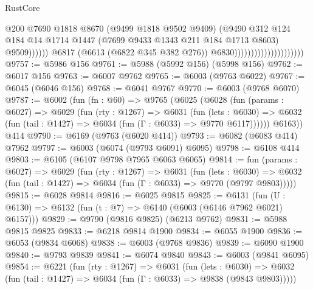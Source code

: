 \begin{lexlean}{RustCore}
\begin{coremodule}
{\begin{coremodule}
{{{{{{{{{{{{{{{{{{{{{{{{{{{{{{{{{{{{{{{{{{{{{{{                                                        @200
                                                        @7690
                                                        @1818
                                                        @8670
                                                        (@9499 @1818 @9502 @9409)
                                                        (@9490
                                                          @312
                                                          @124
                                                          @184
                                                          @14
                                                          @1714
                                                          @1447
                                                          (@7699 @9433 @1343 @211 @184 @1713 @8603)
                                                          @9509))))))
                                              @6817
                                              (@6613 (@6822 @345 @382 @276))
                                              @6830)))))))))))))))))))))
@9757 := @5986 @156
@9761 := @5988 (@5992 @156) (@5998 @156)
@9762 := @6017 @156
@9763 := @6007 @9762
@9765 := @6003 (@9763 @6022)
@9767 := @6045 (@6046 @156)
@9768 := @6041 @9767
@9770 := @6003 (@9768 @6070)
@9787 := @6002
    (fun (fn : @60) =>
    @9765
      (@6025
        (@6028
          (fun (params : @6027) =>
          @6029
            (fun (rty : @1267) =>
            @6031
              (fun (lets : @6030) =>
              @6032 (fun (tail : @1427) => @6034 (fun (Γ : @6033) => @9770 @6117))))))
        @6163))
    @414
@9790 := @6169 (@9763 (@6020 @414))
@9793 := @6082 (@6083 @414) @7962
@9797 := @6003 (@6074 (@9793 @6091) @6095)
@9798 := @6108 @414
@9803 := @6105 (@6107 @9798 @7965 @6063 @6065)
@9814 := fun (params : @6027) =>
  @6029
    (fun (rty : @1267) =>
    @6031
      (fun (lets : @6030) =>
      @6032 (fun (tail : @1427) => @6034 (fun (Γ : @6033) => @9770 (@9797 @9803)))))
@9815 := @6028 @9814
@9816 := @6025 @9815
@9825 := @6131 (fun (U : @6130) => @6132 (fun (t : @7) => @6140 (@6003 (@6146 @7962 @6021) @6157)))
@9829 := @9790 (@9816 @9825) (@6213 @9762)
@9831 := @5988 @9815 @9825
@9833 := @6218 @9814 @1900
@9834 := @6055 @1900
@9836 := @6053 (@9834 @6068)
@9838 := @6003 (@9768 @9836)
@9839 := @6090 @1900
@9840 := @9793 @9839
@9841 := @6074 @9840
@9843 := @6003 (@9841 @6095)
@9854 := @6221
    (fun (rty : @1267) =>
    @6031
      (fun (lets : @6030) =>
      @6032 (fun (tail : @1427) => @6034 (fun (Γ : @6033) => @9838 (@9843 @9803)))))
}}}}}}}}}}}}}}}}}}}}}}}}}}}}}}}}}}}}}}}}}}}}}}}
\end{coremodule}}
\end{coremodule}
\end{lexlean}
